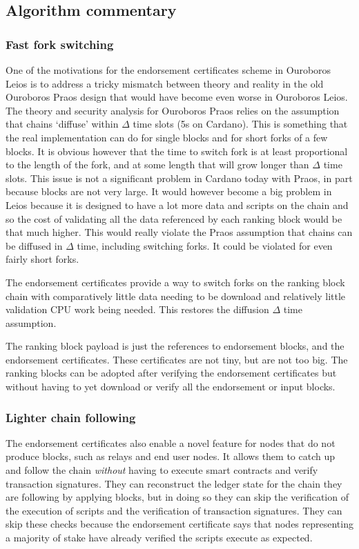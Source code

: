 \documentclass[11pt,a4paper]{article}
\begin{document}
\subsection{Algorithm commentary}

\subsubsection{Fast fork switching}
One of the motivations for the endorsement certificates scheme in Ouroboros
Leios is to address a tricky mismatch between theory and reality in the old
Ouroboros Praos design that would have become even worse in Ouroboros Leios.
The theory and security analysis for Ouroboros Praos relies on the assumption
that chains `diffuse' within $\Delta$ time slots (5s on Cardano). This is
something that the real implementation can do for single blocks and for short
forks of a few blocks. It is obvious however that the time to switch fork is
at least proportional to the length of the fork, and at some length that will
grow longer than $\Delta$ time slots. This issue is not a significant problem
in Cardano today with Praos, in part because blocks are not very large. It
would however become a big problem in Leios because it is designed to have
a lot more data and scripts on the chain and so the cost of validating all the
data referenced by each ranking block would be that much higher. This would
really violate the Praos assumption that chains can be diffused in $\Delta$
time, including switching forks. It could be violated for even fairly short
forks.

The endorsement certificates provide a way to switch forks on the ranking
block chain with comparatively little data needing to be download and
relatively little validation CPU work being needed. This restores the diffusion
$\Delta$ time assumption.

The ranking block payload is just the references to endorsement blocks, and
the endorsement certificates. These certificates are not tiny, but are not too
big. The ranking blocks can be adopted after verifying the endorsement
certificates but without having to yet download or verify all the endorsement
or input blocks.

\subsubsection{Lighter chain following}
\label{sec:lighter-chain-following}

The endorsement certificates also enable a novel feature for nodes that do not
produce blocks, such as relays and end user nodes. It allows them to catch up
and follow the chain \emph{without} having to execute smart contracts and
verify transaction signatures. They can reconstruct the ledger state for the
chain they are following by applying blocks, but in doing so they can skip
the verification of the execution of scripts and the verification of
transaction signatures. They can skip these checks because the endorsement
certificate says that nodes representing a majority of stake have already
verified the scripts execute as expected.
\end{document}
